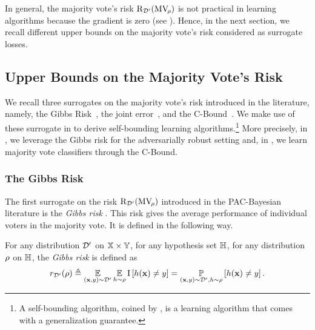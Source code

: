 In general, the majority vote's risk $\text{R}_{\mathcal{D}'}(\text{MV}_{\!\rho})$ is not practical in learning algorithms because the gradient is zero (see ).
Hence, in the next section, we recall different upper bounds on the majority vote's risk considered as surrogate losses.

\subsection{Upper Bounds on the Majority Vote's Risk}
\label{chap:pac-bayes:sec:surrogate}

We recall three surrogates on the majority vote's risk introduced in the literature, namely, the Gibbs Risk~\citep{LangfordShaweTaylor2002,McAllester2003}, the joint error~\citep{LacasseLavioletteMarchandGermainUsunier2006,GermainLacasseLavioletteMarchandRoy2015,MasegosaLorenzenIgelSeldin2020}, and the C-Bound~\citep{Breiman2001,LacasseLavioletteMarchandGermainUsunier2006,RoyLavioletteMarchand2011}.
We make use of these surrogate in  to derive self-bounding learning algorithms.\footnote{A self-bounding algorithm, coined by \citet{Freund1998}, is a learning algorithm that comes with a generalization guarantee.}
More precisely, in , we leverage the Gibbs risk for the adversarially robust setting and, in , we learn majority vote classifiers through the C-Bound.

\subsubsection{The Gibbs Risk}

The first surrogate on the risk $\text{R}_{\mathcal{D}'}(\text{MV}_{\!\rho})$ introduced in the PAC-Bayesian literature is the {\it Gibbs risk} \citep{LangfordShaweTaylor2002,McAllester2003}.
This risk gives the average performance of individual voters in the majority vote. 
It is defined in the following way. 

\begin{definition}\label{chap:pac-bayes:def:gibbs} For any distribution $\mathcal{D}'$ on $\mathbb{X}\times\mathbb{Y}$, for any hypothesis set $\mathbb{H}$, for any distribution $\rho$ on $\mathbb{H}$, the {\it Gibbs risk} is defined as
\begin{align*}
r_{\mathcal{D}'}(\rho) \triangleq \operatorname*{\mathbb{E}}_{(\mathbf{x},y)\sim\mathcal{D}'}   \operatorname*{\mathbb{E}}_{h\sim \rho} \operatorname{I}\left[h(\mathbf{x}) \ne y\right] = \operatorname*{\mathbb{P}}_{(\mathbf{x},y)\sim\mathcal{D}', h\sim\rho}\left[ h(\mathbf{x}) \ne y \right].
\end{align*}
\end{definition}

